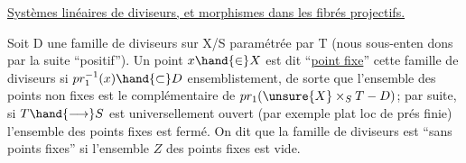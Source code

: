
   \uline{Systèmes linéaires de diviseurs, et morphismes dans les fibrés projectifs.}





















Soit D une famille de diviseurs sur X/S paramétrée par T (nous sous-enten%
dons par la suite ``positif''). Un point $x\hand{\in} X$ est dit ``\uline{point fixe}'' 
cette famille de diviseurs si $pr_1^{-1}(x)\hand{\subset} D$ ensemblistement, de sorte que l'ensemble des
points non fixes est le complémentaire de $pr_1(\unsure{X}\times_S T - D)$; par suite, si
$T\hand{\longrightarrow} S$ est universellement ouvert (par exemple plat loc de prés finie)
l'ensemble des points fixes est fermé. On dit que la famille de diviseurs
est ``sans points fixes'' si l'ensemble $Z$ des points fixes est vide.

